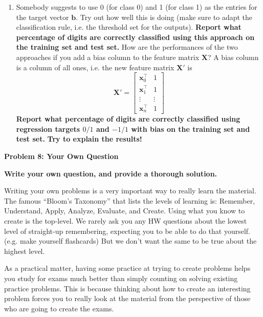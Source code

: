 \documentclass{article}\usepackage[utf8]{inputenc}\usepackage[margin=0.4cm,top=0.4cm,bottom=0.4cm]{geometry}\usepackage[usenames,dvipsnames,svgnames,table]{xcolor}
\begin{document}
\begin{enumerate}
\EndSolution
\item Somebody suggests to use 0 (for class 0) and 1 (for class 1) as the entries for the target vector $\mathbf{b}$. Try out how well this is doing (make sure to adapt the classification rule, i.e. the threshold set for the outputs). \textbf{Report what percentage of digits are correctly classified using this approach on the training set and test set.} How are the performances of the two approaches if you add a bias column to the feature matrix $\mathbf{X}$? A bias column is a column of all ones, i.e. the new feature matrix $\mathbf{X}'$ is $$\mathbf{X}' = \begin{bmatrix}\mathbf{x}_0^\top & 1\\\mathbf{x}_1^\top & 1\\ \vdots & \vdots \\ \mathbf{x}_n^\top & 1 \end{bmatrix}$$ \textbf{Report what percentage of digits are correctly classified using regression targets $0/1$ and $-1/1$ with bias on the training set and test set.} \textbf{Try to explain the results!}
\BeginSolution

\EndSolution
\end{enumerate}
\clearpage

\vspace{-2mm}\noindent\begin{mybox}{\begin{center}\textbf{\color{black}Problem 8: Your Own Question}\end{center}}\end{mybox}\vspace{-2mm}
\vspace{10pt}
\noindent \textbf{Write your own question, and provide a thorough solution.}
\vspace{3pt}

\noindent Writing your own problems is a very important way to really learn the material. The famous ``Bloom's Taxonomy'' that lists the levels of learning is: Remember, Understand, Apply, Analyze, Evaluate, and Create. Using what you know to create is the top-level. We rarely ask you any HW questions about the lowest level of straight-up remembering, expecting you to be able to do that yourself. (e.g. make yourself flashcards) But we don't want the same to be true about the highest level.
\vspace{3pt}

\noindent As a practical matter, having some practice at trying to create problems helps you study for exams much better than simply counting on solving existing practice problems. This is because thinking about how to create an interesting problem forces you to really look at the material from the perspective of those who are going to create the exams. 
\vspace{3pt}
\end{document}
